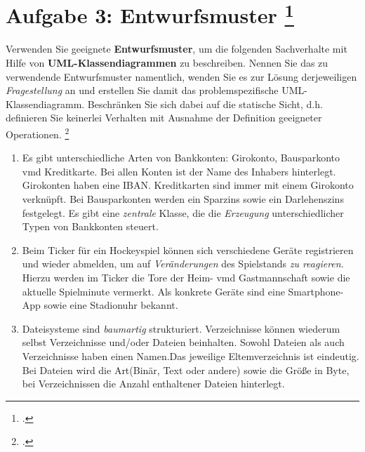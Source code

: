 \documentclass{lehramt-informatik-aufgabe}
\begin{document}
\section{Aufgabe 3: Entwurfsmuster
\footcite{sosy:pu:4}}

Verwenden Sie geeignete \textbf{Entwurfsmuster}, um die folgenden
Sachverhalte mit Hilfe von \textbf{UML-Klassendiagrammen} zu
beschreiben. Nennen Sie das zu verwendende Entwurfsmuster namentlich,
wenden Sie es zur Lösung derjeweiligen \emph{Fragestellung} an und
erstellen Sie damit das problemspezifische UML-Klassendiagramm.
Beschränken Sie sich dabei auf die statische Sicht, d.h. definieren Sie
keinerlei Verhalten mit Ausnahme der Definition geeigneter Operationen.
\footcite[Seite 11]{examen:46116:2017:09}

\begin{enumerate}
\item Es gibt unterschiedliche Arten von Bankkonten: Girokonto,
Bausparkonto vmd Kreditkarte. Bei allen Konten ist der Name des Inhabers
hinterlegt. Girokonten haben eine IBAN. Kreditkarten sind immer mit
einem Girokonto verknüpft. Bei Bausparkonten werden ein Sparzins sowie
ein Darlehenszins festgelegt. Es gibt eine \emph{zentrale} Klasse, die
die \emph{Erzeugung} unterschiedlicher Typen von Bankkonten steuert.

\item Beim Ticker für ein Hockeyspiel können sich verschiedene Geräte
registrieren und wieder abmelden, um auf \emph{Veränderungen} des
Spielstands \emph{zu reagieren}. Hierzu werden im Ticker die Tore der
Heim- vmd Gastmannschaft sowie die aktuelle Spielminute vermerkt. Als
konkrete Geräte sind eine Smartphone-App sowie eine Stadionuhr bekannt.

\item Dateisysteme sind \emph{baumartig} strukturiert. Verzeichnisse
können wiederum selbst Verzeichnisse und/oder Dateien beinhalten. Sowohl
Dateien als auch Verzeichnisse haben einen Namen.Das jeweilige
Eltemverzeichnis ist eindeutig. Bei Dateien wird die Art(Binär, Text
oder andere) sowie die Größe in Byte, bei Verzeichnissen die Anzahl
enthaltener Dateien hinterlegt.

\end{enumerate}
\end{document}
